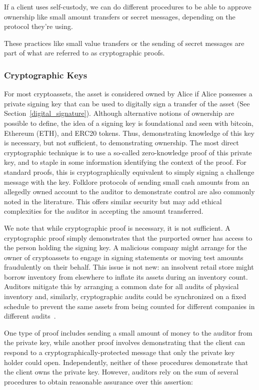 If a client uses self-custody, we can do different procedures to be able to approve ownership like small amount transfers or secret messages, depending on the protocol they're using. 

These practices like small value transfers or the sending of secret messages are part of what are referred to as cryptographic proofs. 

\subsubsection{Cryptographic Keys} 

For most cryptoassets, the asset is considered owned by Alice if Alice possesses a private signing key that can be used to digitally sign a transfer of the asset (See Section~\ref{digital_signature}). Although alternative notions of ownership are possible to define, the idea of a signing key is foundational and seen with bitcoin, Ethereum (ETH), and ERC20 tokens. Thus, demonstrating knowledge of this key is necessary, but not sufficient, to demonstrating ownership. The most direct cryptographic technique is to use a so-called zero-knowledge proof of this private key, and to staple in some information identifying the context of the proof. For standard proofs, this is cryptographically equivalent to simply signing a challenge message with the key. Folklore protocols of sending small cash amounts from an allegedly owned account to the auditor to demonstrate control are also commonly noted in the literature. This offers similar security but may add ethical complexities for the auditor in accepting the amount transferred. 

We note that while cryptographic proof is necessary, it is not sufficient. A cryptographic proof simply demonstrates that the purported owner has access to the person holding the signing key. A malicious company might arrange for the owner of cryptoassets to engage in signing statements or moving test amounts fraudulently on their behalf. This issue is not new: an insolvent retail store might borrow inventory from elsewhere to inflate its assets during an inventory count. Auditors mitigate this by arranging a common date for all audits of physical inventory and, similarly, cryptographic audits could be synchronized on a fixed schedule to prevent the same assets from being counted for different companies in different audits~\cite{dagher2015provisions}. 

One type of proof includes sending a small amount of money to the auditor from the private key, while another proof involves demonstrating that the client can respond to a cryptographically-protected message that only the private key holder could open. Independently, neither of these procedures demonstrate that the client owns the private key. However, auditors rely on the sum of several procedures to obtain reasonable assurance over this assertion: 

